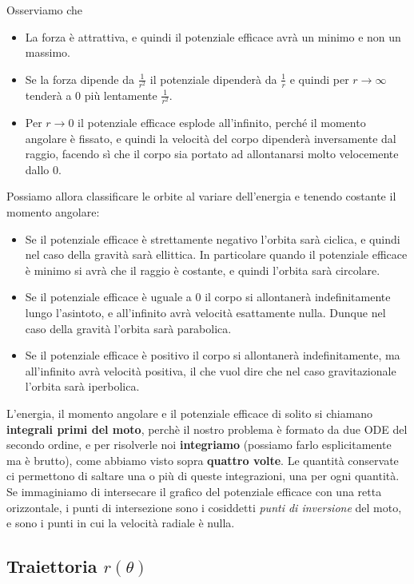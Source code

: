 \documentclass[11pt]{scrartcl}
\begin{document}
	Osserviamo che 
	\begin{itemize}
		\item La forza è attrattiva, e quindi il potenziale efficace avrà un minimo e non un massimo.
		\item Se la forza dipende da $\frac{1}{r^2}$ il potenziale dipenderà da $\frac{1}{r}$ e quindi per $r\to\infty$ tenderà a $0$ più lentamente $\frac{1}{r^2}$.
		\item Per $r\to 0$ il potenziale efficace esplode all'infinito, perché il momento angolare è fissato, e quindi la velocità del corpo dipenderà inversamente dal raggio, facendo sì che il corpo sia portato ad allontanarsi molto velocemente dallo $0$. 
	\end{itemize}
	Possiamo allora classificare le orbite al variare dell'energia e tenendo costante il momento angolare:
	\begin{itemize}
		\item[$V_\text{eff}<0$:] Se il potenziale efficace è strettamente negativo l'orbita sarà ciclica, e quindi nel caso della gravità sarà ellittica. In particolare quando il potenziale efficace è minimo si avrà che il raggio è costante, e quindi l'orbita sarà circolare.
		\item[$V_\text{eff}= 0$:] Se il potenziale efficace è uguale a $0$ il corpo si allontanerà indefinitamente lungo l'asintoto, e all'infinito avrà velocità esattamente nulla. Dunque nel caso della gravità l'orbita sarà parabolica.
		\item[$V_\text{eff}>0$:] Se il potenziale efficace è positivo il corpo si allontanerà indefinitamente, ma all'infinito avrà velocità positiva, il che vuol dire che nel caso gravitazionale l'orbita sarà iperbolica.
	\end{itemize}
	
	L'energia, il momento angolare e il potenziale efficace di solito si chiamano \textbf{integrali primi del moto}, perchè il nostro problema è formato da due ODE del secondo ordine, e per risolverle noi \textbf{integriamo} (possiamo farlo esplicitamente ma è brutto), come abbiamo visto sopra \textbf{quattro volte}. Le quantità conservate ci permettono di saltare una o più di queste integrazioni, una per ogni quantità. \\
	Se immaginiamo di intersecare il grafico del potenziale efficace con una retta  orizzontale, i punti di intersezione sono i cosiddetti \textit{punti di inversione} del moto, e sono i punti in cui la velocità radiale è nulla. 
	
	\subsection{Traiettoria $r(\theta)$}
	
\end{document}

